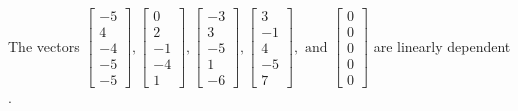 \begin{exercise}
\begin{exerciseStatement}
  \end{exerciseStatement}
  \begin{exerciseAnswer}
   The vectors \(\left[\begin{array}{r}
-5 \\
4 \\
-4 \\
-5 \\
-5
\end{array}\right] , \left[\begin{array}{r}
0 \\
2 \\
-1 \\
-4 \\
1
\end{array}\right] , \left[\begin{array}{r}
-3 \\
3 \\
-5 \\
1 \\
-6
\end{array}\right] , \left[\begin{array}{r}
3 \\
-1 \\
4 \\
-5 \\
7
\end{array}\right] , \text{ and } \left[\begin{array}{r}
0 \\
0 \\
0 \\
0 \\
0
\end{array}\right]\) are 
  	 linearly dependent  .
  


  \end{exerciseAnswer}
\end{exercise}
